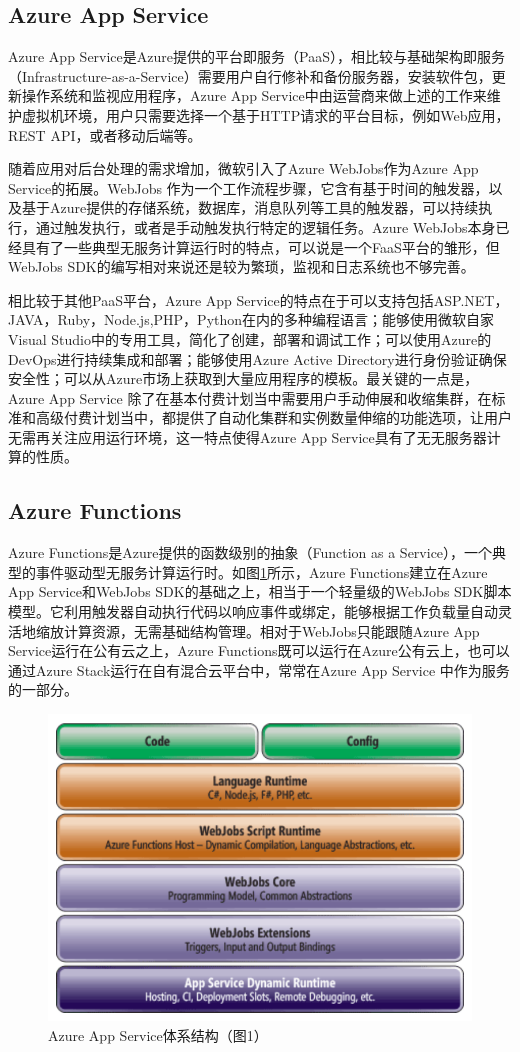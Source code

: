 \documentclass[11pt]{article}
\begin{document}
\subsection{Azure App Service}
Azure App Service是Azure提供的平台即服务（PaaS），相比较与基础架构即服务（Infrastructure-as-a-Service）需要用户自行修补和备份服务器，安装软件包，更新操作系统和监视应用程序，Azure App Service中由运营商来做上述的工作来维护虚拟机环境，用户只需要选择一个基于HTTP请求的平台目标，例如Web应用，REST API，或者移动后端等。

随着应用对后台处理的需求增加，微软引入了Azure WebJobs作为Azure App Service的拓展。WebJobs 作为一个工作流程步骤，它含有基于时间的触发器，以及基于Azure提供的存储系统，数据库，消息队列等工具的触发器，可以持续执行，通过触发执行，或者是手动触发执行特定的逻辑任务。Azure WebJobs本身已经具有了一些典型无服务计算运行时的特点，可以说是一个FaaS平台的雏形，但WebJobs SDK的编写相对来说还是较为繁琐，监视和日志系统也不够完善。

相比较于其他PaaS平台，Azure App Service的特点在于可以支持包括ASP.NET，JAVA，Ruby，Node.js,PHP，Python在内的多种编程语言；能够使用微软自家Visual Studio中的专用工具，简化了创建，部署和调试工作；可以使用Azure的DevOps进行持续集成和部署；能够使用Azure Active Directory进行身份验证确保安全性；可以从Azure市场上获取到大量应用程序的模板。最关键的一点是，Azure App Service 除了在基本付费计划当中需要用户手动伸展和收缩集群，在标准和高级付费计划当中，都提供了自动化集群和实例数量伸缩的功能选项，让用户无需再关注应用运行环境，这一特点使得Azure App Service具有了无无服务器计算的性质。


\subsection{Azure Functions}
Azure Functions是Azure提供的函数级别的抽象（Function as a Service），一个典型的事件驱动型无服务计算运行时。如图\ref{figs:architecture}所示，Azure Functions建立在Azure App Service和WebJobs SDK的基础之上，相当于一个轻量级的WebJobs SDK脚本模型。它利用触发器自动执行代码以响应事件或绑定，能够根据工作负载量自动灵活地缩放计算资源，无需基础结构管理。相对于WebJobs只能跟随Azure App Service运行在公有云之上，Azure Functions既可以运行在Azure公有云上，也可以通过Azure Stack运行在自有混合云平台中，常常在Azure App Service 中作为服务的一部分。

\begin{figure}[!htbp]
	\centering
	\includegraphics[width=0.5\linewidth]{figs/AzureArchitecture.PNG}
	\caption{Azure App Service体系结构（\cite{archi}图1）}
	\label{figs:architecture}
\end{figure}
\end{document}

